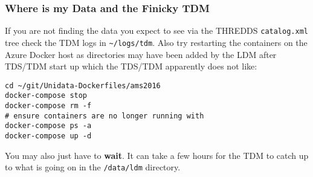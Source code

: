 \documentclass[11pt]{article}
\begin{document}
\subsubsection{\label{orgtarget6} Where is my Data and the Finicky TDM}
\label{sec:orgheadline47}

If you are not finding the data you expect to see via the THREDDS \texttt{catalog.xml} tree check the TDM logs in \texttt{\textasciitilde{}/logs/tdm}. Also try restarting the containers on the Azure Docker host as directories may have been added by the LDM after TDS/TDM start up which the TDS/TDM apparently does not like:

\begin{verbatim}
cd ~/git/Unidata-Dockerfiles/ams2016
docker-compose stop
docker-compose rm -f
# ensure containers are no longer running with
docker-compose ps -a
docker-compose up -d
\end{verbatim}

You may also just have to \textbf{wait}. It can take a few hours for the TDM to catch up to what is going on in the \texttt{/data/ldm} directory.
\end{document}
